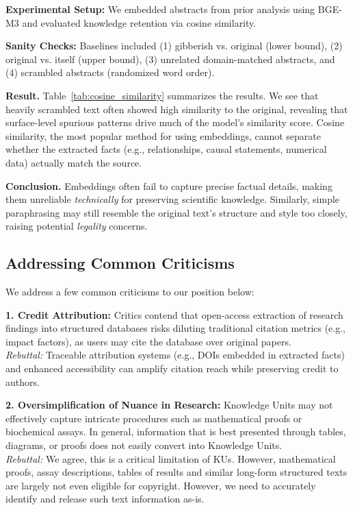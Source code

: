 \textbf{Experimental Setup:} We embedded abstracts from prior analysis using BGE-M3 and evaluated knowledge retention via cosine similarity. 

\textbf{Sanity Checks:} Baselines included (1) gibberish vs. original (lower bound), (2) original vs. itself (upper bound), (3) unrelated domain-matched abstracts, and (4) scrambled abstracts (randomized word order).

\textbf{Result.} Table~\ref{tab:cosine_similarity} summarizes the results. We see that heavily scrambled text often showed high similarity to the original, revealing that surface-level spurious patterns drive much of the model’s similarity score. Cosine similarity, the most popular method for using embeddings, cannot separate whether the extracted facts (e.g., relationships, causal statements, numerical data) actually match the source.

\textbf{Conclusion.} Embeddings often fail to capture precise factual details, making them unreliable \textit{technically} for preserving scientific knowledge. Similarly, simple paraphrasing may still resemble the original text’s structure and style too closely, raising potential \textit{legality} concerns. 


\vspace{-0.2cm}
\subsection{Addressing Common Criticisms}
\label{sec:criticism}

We address a few common criticisms to our position below:

\textbf{1. Credit Attribution:} Critics contend that open-access extraction of research findings into structured databases risks diluting traditional citation metrics (e.g., impact factors), as users may cite the database over original papers.\\
\textit{Rebuttal:} Traceable attribution systems (e.g., DOIs embedded in extracted facts) and enhanced accessibility can amplify citation reach while preserving credit to authors.

\textbf{2. Oversimplification of Nuance in Research:} Knowledge Units may not effectively capture intricate procedures such as mathematical proofs or biochemical assays. In general, information that is best presented through tables, diagrams, or proofs does not easily convert into Knowledge Units.\\
\textit{Rebuttal:} We agree, this is a critical limitation of KUs. However, mathematical proofs, assay descriptions, tables of results and similar long-form structured texts are largely not even eligible for copyright. However, we need to accurately identify and release such text information as-is. 



